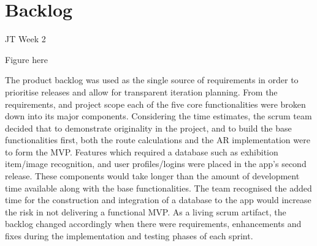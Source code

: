 \section{Backlog}
JT Week 2

Figure here


The product backlog was used as the single source of requirements in order to prioritise releases and allow for transparent iteration planning. From the requirements, and project scope each of the five core functionalities were broken down into its major components. Considering the time estimates, the scrum team decided that to demonstrate originality in the project, and to build the base functionalities first, both the route calculations and the AR implementation were to form the MVP. Features which required a database such as exhibition item/image recognition, and user profiles/logins were placed in the app's second release. These components would take longer than the amount of development time available along with the base functionalities. The team recognised the added time for the construction and integration of a database to the app would increase the risk in not delivering a functional MVP. As a living scrum artifact, the backlog changed accordingly when there were requirements, enhancements and fixes during the implementation and testing phases of each sprint.


